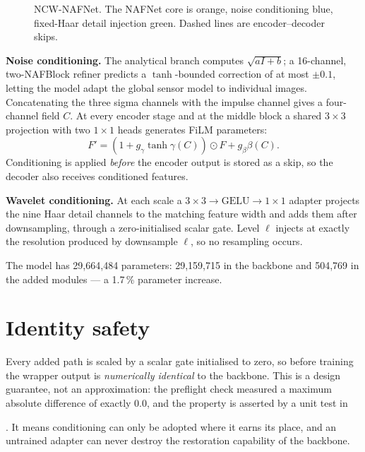 \documentclass[12pt,a4paper]{article}
\newcommand{\codepath}[1]{\begingroup\small\ttfamily\raggedright\path{#1}\par\endgroup}
\begin{document}
\begin{figure}[h]
{}
\caption{NCW-NAFNet. The NAFNet core is orange, noise conditioning blue, fixed-Haar detail injection green. Dashed lines are encoder--decoder skips.}
\end{figure}

\textbf{Noise conditioning.} The analytical branch computes $\sqrt{aI+b}$; a 16-channel, two-NAFBlock refiner predicts a $\tanh$-bounded correction of at most $\pm0.1$, letting the model adapt the global sensor model to individual images. Concatenating the three sigma channels with the impulse channel gives a four-channel field $C$. At every encoder stage and at the middle block a shared $3\times3$ projection with two $1\times1$ heads generates FiLM parameters:
\[
F'=(1+g_\gamma\tanh\gamma(C))\odot F+g_\beta\beta(C).
\]
Conditioning is applied \emph{before} the encoder output is stored as a skip, so the decoder also receives conditioned features.

\textbf{Wavelet conditioning.} At each scale a $3\times3\to\mathrm{GELU}\to1\times1$ adapter projects the nine Haar detail channels to the matching feature width and adds them after downsampling, through a zero-initialised scalar gate. Level $\ell$ injects at exactly the resolution produced by downsample $\ell$, so no resampling occurs.

The model has 29{,}664{,}484 parameters: 29{,}159{,}715 in the backbone and 504{,}769 in the added modules --- a 1.7\,\% parameter increase.

\section{Identity safety}
Every added path is scaled by a scalar gate initialised to zero, so before training the wrapper output is \emph{numerically identical} to the backbone. This is a design guarantee, not an approximation: the preflight check measured a maximum absolute difference of exactly $0.0$, and the property is asserted by a unit test in \codepath{scripts/tests/test_model.py}. It means conditioning can only be adopted where it earns its place, and an untrained adapter can never destroy the restoration capability of the backbone.
\end{document}
